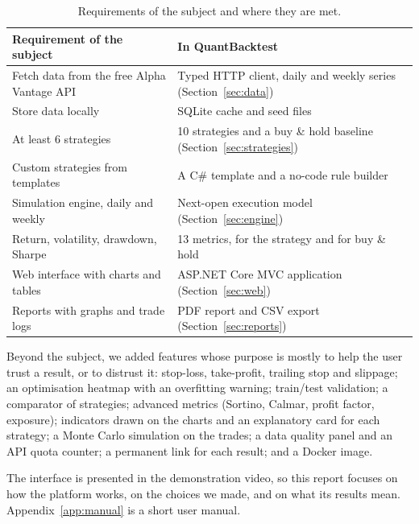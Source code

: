 \documentclass[11pt,a4paper]{article}
\begin{document}
\begin{table}[H]
\centering\small
\begin{tabularx}{\textwidth}{>{\raggedright\arraybackslash}p{5.6cm}Y}
\toprule
\textbf{Requirement of the subject} & \textbf{In QuantBacktest} \\
\midrule
Fetch data from the free Alpha Vantage API & Typed HTTP client, daily and weekly series (Section~\ref{sec:data}) \\
Store data locally & SQLite cache and seed files \\
At least 6 strategies & 10 strategies and a buy \& hold baseline (Section~\ref{sec:strategies}) \\
Custom strategies from templates & A C\# template and a no-code rule builder \\
Simulation engine, daily and weekly & Next-open execution model (Section~\ref{sec:engine}) \\
Return, volatility, drawdown, Sharpe & 13 metrics, for the strategy and for buy \& hold \\
Web interface with charts and tables & ASP.NET Core MVC application (Section~\ref{sec:web}) \\
Reports with graphs and trade logs & PDF report and CSV export (Section~\ref{sec:reports}) \\
\bottomrule
\end{tabularx}
\caption{Requirements of the subject and where they are met.}
\end{table}

Beyond the subject, we added features whose purpose is mostly to help the user trust a result, or to distrust it: stop-loss, take-profit, trailing stop and slippage; an optimisation heatmap with an overfitting warning; train/test validation; a comparator of strategies; advanced metrics (Sortino, Calmar, profit factor, exposure); indicators drawn on the charts and an explanatory card for each strategy; a Monte Carlo simulation on the trades; a data quality panel and an API quota counter; a permanent link for each result; and a Docker image.

The interface is presented in the demonstration video, so this report focuses on how the platform works, on the choices we made, and on what its results mean. Appendix~\ref{app:manual} is a short user manual.
\end{document}
